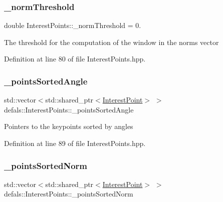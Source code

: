 \subsubsection{\texorpdfstring{\+\_\+norm\+Threshold}{\_normThreshold}}
{\footnotesize\ttfamily double Interest\+Points\+::\+\_\+norm\+Threshold = 0.\hspace{0.3cm}{\ttfamily [static]}}

The threshold for the computation of the window in the norms vector 

Definition at line 80 of file Interest\+Points.\+hpp.

\mbox{\label{classdefals_1_1_interest_points_acb150169938a65343ff586737deb0ee4}} 
\subsubsection{\texorpdfstring{\+\_\+points\+Sorted\+Angle}{\_pointsSortedAngle}}
{\footnotesize\ttfamily std\+::vector$<$std\+::shared\+\_\+ptr$<$\hyperlink{classdefals_1_1_interest_point}{Interest\+Point}$>$ $>$ defals\+::\+Interest\+Points\+::\+\_\+points\+Sorted\+Angle\hspace{0.3cm}{\ttfamily [private]}}

Pointers to the keypoints sorted by angles 

Definition at line 89 of file Interest\+Points.\+hpp.

\mbox{\label{classdefals_1_1_interest_points_af2d65ed03d451cd08ab3a8a2f31f7801}} 
\subsubsection{\texorpdfstring{\+\_\+points\+Sorted\+Norm}{\_pointsSortedNorm}}
{\footnotesize\ttfamily std\+::vector$<$std\+::shared\+\_\+ptr$<$\hyperlink{classdefals_1_1_interest_point}{Interest\+Point}$>$ $>$ defals\+::\+Interest\+Points\+::\+\_\+points\+Sorted\+Norm\hspace{0.3cm}{\ttfamily [private]}}


